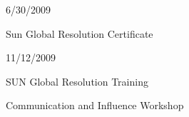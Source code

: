 \documentclass[10pt]{article}
\renewcommand{\section}[2]%
        {\pagebreak[2]\vspace{1.4\baselineskip}%
         \phantomsection\addcontentsline{toc}{section}{#1}%
         \hspace{0in}%
         \marginpar{
         \raggedright \scshape #1}#2}
\newenvironment{innerlist}[1][\enskip\textbullet]%
        {\begin{compactitem}[#1]}{\end{compactitem}}
\newcommand{\blankline}{\quad\pagebreak[2]}
\begin{document}

6/30/2009

\blankline

Sun Global Resolution Certificate


11/12/2009


\blankline

\begin{innerlist}
\item SUN Global Resolution Training
\item Communication and Influence Workshop
\end{innerlist}

\end{document}
